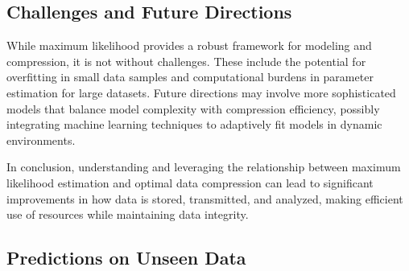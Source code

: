 \subsection{Challenges and Future Directions}
While maximum likelihood provides a robust framework for modeling and compression, it is not without challenges. These include the potential for overfitting in small data samples and computational burdens in parameter estimation for large datasets. Future directions may involve more sophisticated models that balance model complexity with compression efficiency, possibly integrating machine learning techniques to adaptively fit models in dynamic environments.

In conclusion, understanding and leveraging the relationship between maximum likelihood estimation and optimal data compression can lead to significant improvements in how data is stored, transmitted, and analyzed, making efficient use of resources while maintaining data integrity.

\subsection{Predictions on Unseen Data}